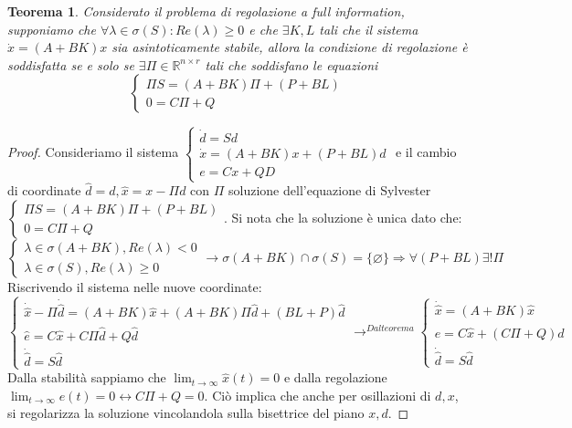 \documentclass{article}
\newtheorem{theorem}{\textbf{Teorema}}
\theoremstyle{definition}
\begin{document}
\begin{theorem}
    Considerato il problema di regolazione a full information, supponiamo che \(\forall\lambda\in\sigma{(S)}:Re(\lambda)\geq 0\) e che \(\exists K,L\) tali che il sistema \(\dot{x}=(A+BK)x\) sia asintoticamente stabile, allora la condizione di regolazione è soddisfatta se e solo se \(\exists \Pi\in\mathbb{R}^{n\times r}\) tali che soddisfano le equazioni\begin{equation*}
        \begin{cases}
            \Pi S=(A+BK)\Pi+(P+BL)\\
            0=C\Pi+Q
        \end{cases}
    \end{equation*}
\end{theorem}
\begin{proof}
    Consideriamo il sistema \(\begin{cases}
        \dot{d}=Sd              \\
        \dot{x}=(A+BK)x+(P+BL)d \\
        e=Cx+QD
    \end{cases}\) e il cambio di coordinate \(\hat{d}=d,\hat{x}=x-\Pi d\)  con \(\Pi \) soluzione dell'equazione di Sylvester \( \begin{cases}
        \Pi S=(A+BK)\Pi+(P+BL)\\
        0=C\Pi+Q
    \end{cases}\).\newline
    Si nota che la soluzione è unica dato che:\begin{equation*}
        \begin{cases}
            \lambda\in\sigma{(A+BK)},Re(\lambda )< 0 \\
            \lambda\in\sigma{(S)},Re(\lambda )\geq 0
        \end{cases}\rightarrow\sigma{(A+BK)}\cap\sigma{(S)}=\{\varnothing \}\Rightarrow \forall(P+BL)\exists!\Pi
    \end{equation*}
    Riscrivendo il sistema nelle nuove coordinate:
    \begin{equation*}
        \begin{cases}
            \dot{\hat{x}}-\Pi \dot{\hat{d}}=(A+BK)\hat{x}+(A+BK)\Pi\hat{d}+(BL+P)\hat{d}\\
            \hat{e}=C\hat{x}+C\Pi\hat{d}+Q\hat{d}\\
            \dot{\hat{d}}=S\hat{d}
        \end{cases}
        \rightarrow^{Dal teorema}\begin{cases}
            \dot{\hat{x}}=(A+BK)\hat{x}\\
            e=C\hat{x}+(C\Pi+Q)\hat{d}\\
            \dot{\hat{d}}=S\hat{d}
        \end{cases}
    \end{equation*}
    Dalla stabilità sappiamo che \(\lim_{t\rightarrow\infty} \hat{x}(t)=0\) e dalla regolazione \(\lim_{t\rightarrow\infty}e(t)=0\leftrightarrow C\Pi+Q=0\). Ciò implica che anche per osillazioni di \(d,x\), si regolarizza la soluzione vincolandola sulla bisettrice del piano \(x,d\).
\end{proof}
\end{document}
